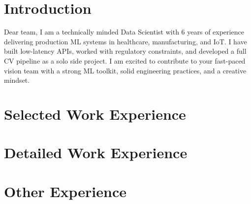 \documentclass[11pt,a4paper]{moderncv}
\begin{document}
\makecvtitle

\section*{Introduction}
Dear \company{} team, I am a technically minded Data Scientist with 6 years of experience delivering production ML systems in healthcare, manufacturing, and IoT. I have built low-latency APIs, worked with regulatory constraints, and developed a full CV pipeline as a solo side project. I am excited to contribute to your fast-paced vision team with a strong ML toolkit, solid engineering practices, and a creative mindset.

\section{Selected Work Experience}


% 






\newpage
\section{Detailed Work Experience}



% 

\section{Other Experience}

\end{document}
